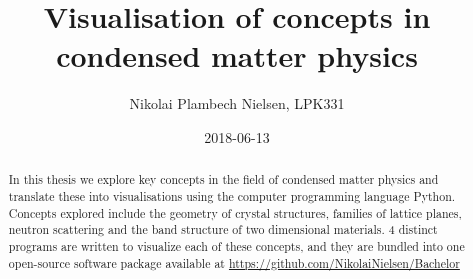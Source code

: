 \documentclass[a4paper,11pt]{article}
\title{Visualisation of concepts in condensed matter physics}
\author{Nikolai Plambech Nielsen, LPK331}
\date{2018-06-13}
\numberwithin{equation}{section}
\begin{document}
	
	
	
	
	\begin{abstract}
		In this thesis we explore key concepts in the field of condensed matter physics and translate these into visualisations using the computer programming language Python. Concepts explored include the geometry of crystal structures, families of lattice planes, neutron scattering and the band structure of two dimensional materials. 4 distinct programs are written to visualize each of these concepts, and they are bundled into one open-source software package available at \url{https://github.com/NikolaiNielsen/Bachelor}
	\end{abstract}
	\tableofcontents
	
	\newpage
	
	\setcounter{page}{1}
	
	
	
	
	
	
	
	
	
	
	
	
	
	\newpage
	\appendix
	
	
\end{document}
